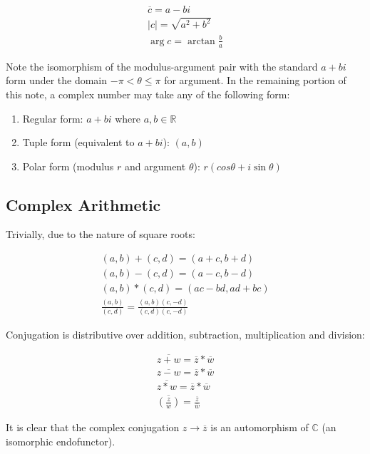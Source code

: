 \documentclass[12pt]{article}
\begin{document}
	\begin{gather*}
		\overline{c} = a - bi \\
		\lvert c \rvert = \sqrt{a^2 + b^2} \\
		\arg c = \arctan \frac{b}{a}
	\end{gather*}
	
	Note the isomorphism of the modulus-argument pair with the standard $a + bi$ form under the domain $-\pi < \theta \leq \pi$ for argument. In the remaining portion of this note, a complex number may take any of the following form:
	
	\begin{enumerate}
		\item Regular form: $a + bi$ where $a, b \in \mathbb{R}$
		\item Tuple form (equivalent to $a + bi$): $(a, b)$
		\item Polar form (modulus $r$ and argument $\theta$): $r(cos \theta + i \sin \theta)$
	\end{enumerate}
	
	\subsection{Complex Arithmetic}
	
	Trivially, due to the nature of square roots:
	
	\begin{gather*}
		(a, b) + (c, d) = (a + c, b + d) \\
		(a, b) - (c, d) = (a - c, b - d) \\
		(a, b) * (c, d) = (ac - bd, ad + bc) \\
		\frac{(a, b)}{(c, d)} = \frac{(a, b)(c, -d)}{(c, d)(c, -d)}
	\end{gather*}
	
	Conjugation is distributive over addition, subtraction, multiplication and division:
	
	\begin{gather*}
		\overline{z + w} = \overline{z} * \overline{w} \\
		\overline{z - w} = \overline{z} * \overline{w} \\
		\overline{z * w} = \overline{z} * \overline{w} \\
		\overline{\left(\frac{z}{w}\right)} = \frac{\overline{z}}{\overline{w}}
	\end{gather*}
	
	It is clear that the complex conjugation $z \to \overline z$ is an automorphism of $\mathbb{C}$ (an isomorphic endofunctor).
	
\end{document}
